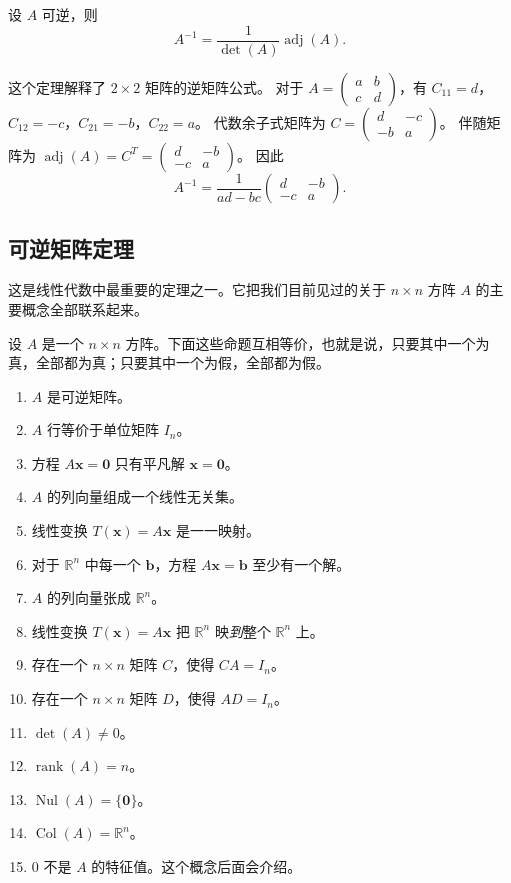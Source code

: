 \begin{theorem}[逆矩阵公式]
设 $A$ 可逆，则
\[ A^{-1}=\frac{1}{\det(A)}\operatorname{adj}(A). \]
\end{theorem}
\begin{remark}
这个定理解释了 $2\times2$ 矩阵的逆矩阵公式。
对于 $A=\begin{pmatrix}a&b\\c&d\end{pmatrix}$，有
$C_{11}=d$，$C_{12}=-c$，$C_{21}=-b$，$C_{22}=a$。
代数余子式矩阵为 $C=\begin{pmatrix}d&-c\\-b&a\end{pmatrix}$。
伴随矩阵为 $\operatorname{adj}(A)=C^T=\begin{pmatrix}d&-b\\-c&a\end{pmatrix}$。
因此
\[ A^{-1}=\frac{1}{ad-bc}\begin{pmatrix}d&-b\\-c&a\end{pmatrix}. \]
\end{remark}

\subsection{可逆矩阵定理}
这是线性代数中最重要的定理之一。它把我们目前见过的关于 $n\times n$ 方阵 $A$ 的主要概念全部联系起来。

\begin{theorem}[可逆矩阵定理]
设 $A$ 是一个 $n\times n$ 方阵。下面这些命题互相等价，也就是说，只要其中一个为真，全部都为真；只要其中一个为假，全部都为假。
\begin{enumerate}
    \item $A$ 是可逆矩阵。
    \item $A$ 行等价于单位矩阵 $I_n$。
    \item 方程 $A\mathbf{x}=\mathbf{0}$ 只有平凡解 $\mathbf{x}=\mathbf{0}$。
    \item $A$ 的列向量组成一个线性无关集。
    \item 线性变换 $T(\mathbf{x})=A\mathbf{x}$ 是一一映射。
    \item 对于 $\mathbb{R}^n$ 中每一个 $\mathbf{b}$，方程 $A\mathbf{x}=\mathbf{b}$ 至少有一个解。
    \item $A$ 的列向量张成 $\mathbb{R}^n$。
    \item 线性变换 $T(\mathbf{x})=A\mathbf{x}$ 把 $\mathbb{R}^n$ 映\emph{到}整个 $\mathbb{R}^n$ 上。
    \item 存在一个 $n\times n$ 矩阵 $C$，使得 $CA=I_n$。
    \item 存在一个 $n\times n$ 矩阵 $D$，使得 $AD=I_n$。
    \item $\det(A)\neq0$。
    \item $\operatorname{rank}(A)=n$。
    \item $\operatorname{Nul}(A)=\{\mathbf{0}\}$。
    \item $\operatorname{Col}(A)=\mathbb{R}^n$。
    \item $0$ 不是 $A$ 的特征值。这个概念后面会介绍。
\end{enumerate}
\end{theorem}

